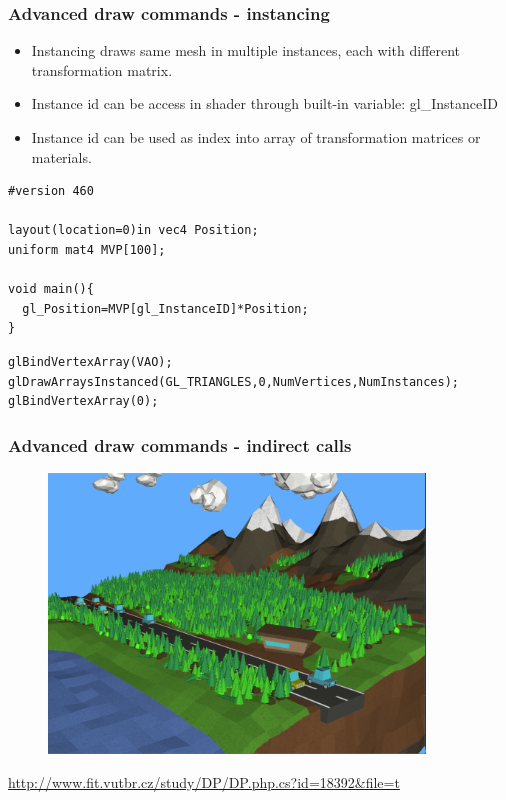 \begin{frame}[fragile]
\frametitle{Advanced draw commands - instancing}
	\begin{itemize}
	\item Instancing draws same mesh in multiple instances, each with different transformation matrix.
	\item Instance id can be access in shader through built-in variable: gl\_InstanceID
	\item Instance id can be used as index into array of transformation matrices or materials.
	\end{itemize}
{\scriptsize
\begin{verbatim}
#version 460

layout(location=0)in vec4 Position;
uniform mat4 MVP[100];

void main(){
  gl_Position=MVP[gl_InstanceID]*Position;
}
\end{verbatim}
}
{\scriptsize
\begin{verbatim}
glBindVertexArray(VAO);
glDrawArraysInstanced(GL_TRIANGLES,0,NumVertices,NumInstances);
glBindVertexArray(0);
\end{verbatim}
}
\end{frame}

\begin{frame}[fragile]
\frametitle{Advanced draw commands - indirect calls}
	\begin{figure}[h]
	\includegraphics[width=10cm,keepaspectratio]{pics/indirect.png}
	\end{figure}
\url{http://www.fit.vutbr.cz/study/DP/DP.php.cs?id=18392&file=t}
\end{frame}

